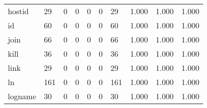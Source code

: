 \begin{longtable}{lp{2.0cm}p{2.0cm}p{2.0cm}p{2.0cm}p{2.0cm}p{2.0cm}p{2.0cm}p{2.0cm}p{2.0cm}}
hostid    &                     29 &                                             0 &                                            0 &                                           0 &                                            0 &                                         29 &                                1.000 &                                  1.000 &                                1.000 \\
id        &                     60 &                                             0 &                                            0 &                                           0 &                                            0 &                                         60 &                                1.000 &                                  1.000 &                                1.000 \\
join      &                     66 &                                             0 &                                            0 &                                           0 &                                            0 &                                         66 &                                1.000 &                                  1.000 &                                1.000 \\
kill      &                     36 &                                             0 &                                            0 &                                           0 &                                            0 &                                         36 &                                1.000 &                                  1.000 &                                1.000 \\
link      &                     29 &                                             0 &                                            0 &                                           0 &                                            0 &                                         29 &                                1.000 &                                  1.000 &                                1.000 \\
ln        &                    161 &                                             0 &                                            0 &                                           0 &                                            0 &                                        161 &                                1.000 &                                  1.000 &                                1.000 \\
logname   &                     30 &                                             0 &                                            0 &                                           0 &                                            0 &                                         30 &                                1.000 &                                  1.000 &                                1.000 \\

\end{longtable}
